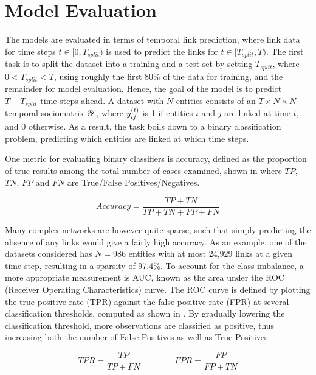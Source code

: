\section{Model Evaluation}

The models are evaluated in terms of temporal link prediction, where link data for time steps $t\in [0,T_{split})$ is used to predict the links for $t\in [T_{split},T)$. The first task is to split the dataset into a training and a test set by setting $T_{split}$, where $0 < T_{split} < T$, using roughly the first 80\% of the data for training, and the remainder for model evaluation. Hence, the goal of the model is to predict $T-T_{split}$ time steps ahead. A dataset with $N$ entities consists of an $T\times N\times N$ temporal sociomatrix $\bm{\mathscr{Y}}$, where $\sub(y)^\t$ is 1 if entities $i$ and $j$ are linked at time $t$, and 0 otherwise. As a result, the task boils down to a binary classification problem, predicting which entities are linked at which time steps.

One metric for evaluating binary classifiers is accuracy, defined as the proportion of true results among the total number of cases examined, shown in  where $TP$, $TN$, $FP$ and $FN$ are True/False Positives/Negatives.

\begin{equation}\label{eq:eval-accuracy}
    Accuracy = \frac{TP+TN}{TP+TN+FP+FN}
\end{equation}

Many complex networks are however quite sparse, such that simply predicting the absence of any links would give a fairly high accuracy. As an example, one of the datasets considered has $N=986$ entities with at most 24,929 links at a given time step, resulting in a sparsity of 97.4\%. To account for the class imbalance, a more appropriate measurement is AUC, known as the area under the ROC (Receiver Operating Characteristics) curve. The ROC curve is defined by plotting the true positive rate (TPR) against the false positive rate (FPR) at several classification thresholds, computed as shown in . By gradually lowering the classification threshold, more observations are classified as positive, thus increasing both the number of False Positives as well as True Positives.

\begin{equation}\label{eq:eval-tpr-fpr}
    TPR = \frac{TP}{TP + FN} \qquad\qquad FPR = \frac{FP}{FP + TN}
\end{equation}

